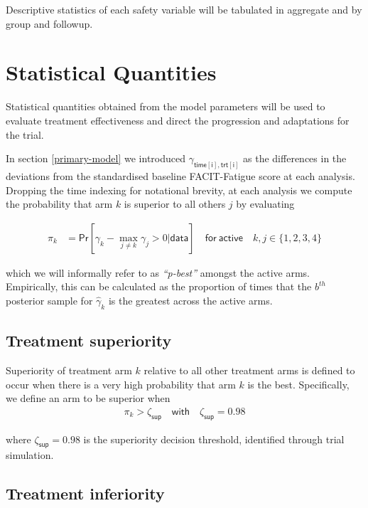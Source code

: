 \documentclass[
]{article}
\begin{document}
Descriptive statistics of each safety variable will be tabulated in aggregate and by group and followup.

\clearpage

\hypertarget{statistical-quantities}{%
\section{Statistical Quantities}\label{statistical-quantities}}

Statistical quantities obtained from the model parameters will be used to evaluate treatment effectiveness and direct the progression and adaptations for the trial.

In section \ref{primary-model} we introduced $\gamma_{\mathsf{time[i], trt[i]}}$ as the differences in the deviations from the standardised baseline FACIT-Fatigue score at each analysis.
Dropping the time indexing for notational brevity, at each analysis we compute the probability that arm $k$ is superior to all others $j$ by evaluating

\[
\begin{aligned}
\pi_{k} &= \mathsf{Pr}[\gamma_{k} - \max_{j\ne k} \gamma_j >0|\mathsf{data}] \quad \mathsf{for \  active} \quad k,j \in \{1, 2, 3, 4\}
\end{aligned}
\]

which we will informally refer to as \textit{``p-best''} amongst the active arms.
Empirically, this can be calculated as the proportion of times that the $b^{th}$ posterior sample for $\widehat{\gamma}_k$ is the greatest across the active arms.

\hypertarget{treatment-superiority}{%
\subsection{Treatment superiority}\label{treatment-superiority}}

Superiority of treatment arm $k$ relative to all other treatment arms is defined to occur when there is a very high probability that arm $k$ is the best.
Specifically, we define an arm to be superior when
\[
\begin{aligned}
\pi_{k} > \zeta_{\mathsf{sup}} \quad \mathsf{with} \quad \zeta_{\mathsf{sup}} = 0.98
\end{aligned}
\]

where $\zeta_{\mathsf{sup}} = 0.98$ is the superiority decision threshold, identified through trial simulation.

\hypertarget{treatment-inferiority}{%
\subsection{Treatment inferiority}\label{treatment-inferiority}}
\end{document}
